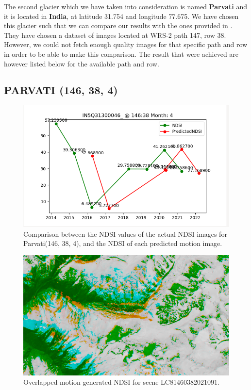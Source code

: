 \documentclass[12pt, a4paper]{report}
\begin{document}
	\vfill
	\newpage{}
	
	\par The second glacier which we have taken into consideration is named \textbf{Parvati} and it is located in \textbf{India}, at latitude 31.754 and longitude 77.675. We have chosen this glacier such that we can compare our results with the ones provided in \cite{parvati}. They have chosen a dataset of images located at WRS-2 path 147, row 38. However, we could not fetch enough quality images for that specific path and row in order to be able to make this comparison. The result that were achieved are however listed below for the available path and row.
	
	\subsection{PARVATI (146, 38, 4)}
	
	\begin{figure}[h!]
		\centering
		\includegraphics[width=\linewidth]{../images/experiment_146385.png}
		\caption{Comparison between the NDSI values of the actual NDSI images for Parvati(146, 38, 4), and the NDSI of each predicted motion image.}
		\label{fig:parvati_146384}
	\end{figure}

	\begin{figure}[h!]
	\centering
	\includegraphics[width=\linewidth]{../images/experiment_1460384_image.png}
	\caption{Overlapped motion generated NDSI for scene LC81460382021091.}
	\label{fig:experiment_1460384_image}
	\end{figure}
	
\end{document}
